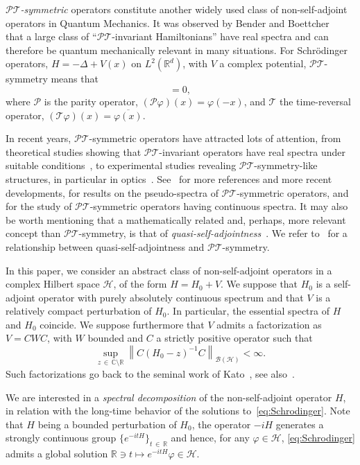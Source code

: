 \documentclass[AHL,Unicode,longabstracts,published]{cedram}
\newcommand{\Hi}{\mathcal{H}}
\newcommand{\bbC}{\mathbb{C}}
\newcommand{\R}{\mathbb{R}}
\newcommand{\clPT}{\mathcal{PT}}
\newcommand{\clP}{\mathcal{P}}
\newcommand{\clT}{\mathcal{T}}
\newcommand{\clB}{\mathcal{B}}
\newcommand*\bbC{\mathbb{C}}
\newcommand{\Hi}{\mathcal{H}}
\newcommand{\R}{\mathbb{R}}
\begin{document}
\emph{$\clPT$-symmetric} operators constitute another widely used class of non-self-adjoint operators in Quantum Mechanics. It was observed by Bender and Boettcher~\cite{BeBo98_01} that a large class of ``$\clPT$-invariant Hamiltonians'' have real spectra and can therefore be quantum mechanically relevant in many situations. For Schr\"odinger operators, $H=-\Delta+V(x)$ on $L^2(\R^d)$, with $V$ a complex potential, $\clPT$-symmetry means that
\begin{equation*}
[H, \clPT]= 0,
\end{equation*}
where $\clP$ is the parity operator, $(\clP\varphi)(x)=\varphi(-x)$, and $\clT$ the time-reversal operator, $(\clT\varphi)(x)=\overline{\varphi(x)}$.

In recent years, $\clPT$-symmetric operators have attracted lots of attention, from theoretical studies showing that $\clPT$-invariant operators have real spectra under suitable conditions~\cite{DoDuTa01_01,KrBiZn06_01,
Kr08_01,KrSiTaVi15_01,Mo02_01,Sh02_01}, to experimental studies revealing $\clPT$-symmetry-like structures, in particular in optics~\cite{Lo09_01,Re12_01,Ru10_01}. See~\cite{El18_01} for more references and more recent developments, \cite{KrSiTaVi15_01} for results on the pseudo-spectra of $\clPT$-symmetric operators, and~\cite{BoKr08_01,BoKr12_01,WeBe20_01} for the study of $\clPT$-symmetric operators having continuous spectra. It may also be worth mentioning that a mathematically related and, perhaps, more relevant concept than $\clPT$-symmetry, is that of \emph{quasi-self-adjointness}~\cite{Di61_01,ScGeHa92_01}. We refer to~\cite{KrSiTaVi15_01} for a relationship between quasi-self-adjointness and $\clPT$-symmetry.

In this paper, we consider an abstract class of non-self-adjoint operators in a complex Hilbert space $\Hi$, of the form $H=H_0+V$. We suppose that $H_0$ is a self-adjoint operator with purely absolutely continuous spectrum and that $V$ is a relatively compact perturbation of $H_0$. In particular, the essential spectra of $H$ and $H_0$ coincide. We suppose furthermore that $V$ admits a factorization as $V=CWC$, with $W$ bounded and $C$ a strictly positive operator such that
\begin{equation*}
\sup_{z\,\in\,\bbC\setminus\R}\left\|C(H_0-z)^{-1}C\right\|_{\clB(\Hi)}<\infty.
\end{equation*}
Such factorizations go back to the seminal work of Kato~\cite{Ka65_01}, see also~\cite{KoKu66_01}.

We are interested in a \emph{spectral decomposition} of the non-self-adjoint operator $H$, in relation with the long-time behavior of the solutions to~\eqref{eq:Schrodinger}. Note that $H$ being a bounded perturbation of $H_0$, the operator $-iH$ generates a strongly continuous group $\{e^{-itH}\}_{t\,\in\,\R}$ and hence, for any $\varphi\in\Hi$, \eqref{eq:Schrodinger} admits a global solution $\R\ni t\mapsto e^{-itH}\varphi\in\Hi$.
\end{document}
